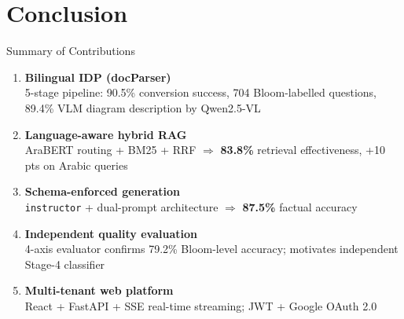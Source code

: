\documentclass[aspectratio=169]{beamer}
\begin{document}
\section{Conclusion}

\begin{frame}{Summary of Contributions}
  \begin{enumerate}
    \item \textbf{Bilingual IDP (docParser)}\\
          5-stage pipeline: 90.5\% conversion success, 704 Bloom-labelled questions,
          89.4\% VLM diagram description by Qwen2.5-VL

    \vspace{4pt}
    \item \textbf{Language-aware hybrid RAG}\\
          AraBERT routing + BM25 + RRF $\Rightarrow$ \textbf{83.8\%} retrieval effectiveness,
          +10 pts on Arabic queries

    \vspace{4pt}
    \item \textbf{Schema-enforced generation}\\
          \texttt{instructor} + dual-prompt architecture $\Rightarrow$ \textbf{87.5\%} factual accuracy

    \vspace{4pt}
    \item \textbf{Independent quality evaluation}\\
          4-axis evaluator confirms 79.2\% Bloom-level accuracy;
          motivates independent Stage-4 classifier

    \vspace{4pt}
    \item \textbf{Multi-tenant web platform}\\
          React + FastAPI + SSE real-time streaming; JWT + Google OAuth 2.0
  \end{enumerate}
\end{frame}
\end{document}

